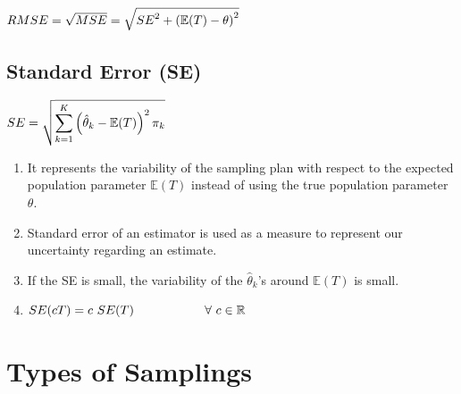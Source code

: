 \hfill
$
    RMSE 
    = \sqrt{MSE} 
    = \sqrt{{SE}^2 + \left(\mathbb{E}(T) - \theta\right)^2}
$
\hfill \cite{statistics/book/Statistics-for-Data-Scientists/Maurits-Kaptein}






\subsection{Standard Error (SE)}\label{Sampling Plans/Measures of closeness/Standard Error (SE)}


\hfill
$
    SE = \sqrt{
        \displaystyle\sum_{k=1}^{K} \left(
            \hat{\theta}_k - \mathbb{E}(T)
        \right)^2
        \pi_k
    }
$
\hfill \cite{statistics/book/Statistics-for-Data-Scientists/Maurits-Kaptein}


\begin{enumerate}
    \item It represents the variability of the sampling plan with respect to the expected population parameter $\mathbb{E}(T)$ instead of using the true population parameter $\theta$.
    \hfill \cite{statistics/book/Statistics-for-Data-Scientists/Maurits-Kaptein}

    \item Standard error of an estimator is used as a measure to represent our uncertainty regarding an estimate.
    \hfill \cite{statistics/book/Statistics-for-Data-Scientists/Maurits-Kaptein}

    \item If the SE is small, the variability of the $\hat{\theta}_k$’s around $\mathbb{E}(T)$ is small. 
    \hfill \cite{statistics/book/Statistics-for-Data-Scientists/Maurits-Kaptein}

    \item $SE(cT ) = c\ SE(T) \hspace{2cm} \forall\  c \in \mathbb{R}$
    \hfill \cite{statistics/book/Statistics-for-Data-Scientists/Maurits-Kaptein}
\end{enumerate}








\section{Types of Samplings}


